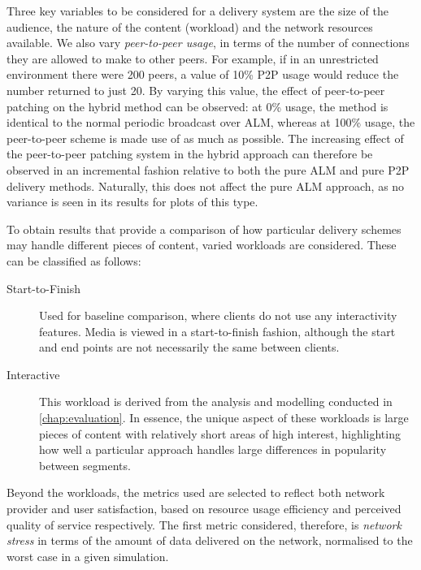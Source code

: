 Three key variables to be considered for a delivery system are the size of the audience, the nature of the content (workload) and the network resources available. We also vary \emph{peer-to-peer usage}, in terms of the number of connections they are allowed to make to other peers. For example, if in an unrestricted environment there were 200 peers, a value of 10\% P2P usage would reduce the number returned to just 20. By varying this value, the effect of peer-to-peer patching on the hybrid method can be observed: at 0\% usage, the method is identical to the normal periodic broadcast over ALM, whereas at 100\% usage, the peer-to-peer scheme is made use of as much as possible. The increasing effect of the peer-to-peer patching system in the hybrid approach can therefore be observed in an incremental fashion relative to both the pure ALM and pure P2P delivery methods. Naturally, this does not affect the pure ALM approach, as no variance is seen in its results for plots of this type.


To obtain results that provide a comparison of how particular delivery schemes may handle different pieces of content, varied workloads are considered. These can be classified as follows:

\begin{description}
  \item[Start-to-Finish] Used for baseline comparison, where clients do not use any interactivity features. Media is viewed in a start-to-finish fashion, although the start and end points are not necessarily the same between clients.

  \item[Interactive] This workload is derived from the analysis and modelling conducted in \autoref{chap:evaluation}. In essence, the unique aspect of these workloads is large pieces of content with relatively short areas of high interest, highlighting how well a particular approach handles large differences in popularity between segments.
\end{description}


Beyond the workloads, the metrics used are selected to reflect both network provider and user satisfaction, based on resource usage efficiency and perceived quality of service respectively. The first metric considered, therefore, is \emph{network stress} in terms of the amount of data delivered on the network, normalised to the worst case in a given simulation.

